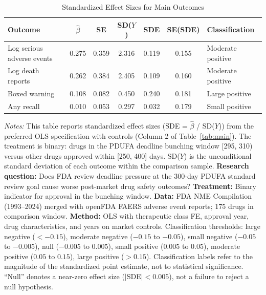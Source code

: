 \begin{table}[H]
\centering
\caption{Standardized Effect Sizes for Main Outcomes}
\label{tab:sde}
\begin{tabular}{lcccccl}
\toprule
Outcome & $\hat{\beta}$ & SE & SD($Y$) & SDE & SE(SDE) & Classification \\
\midrule
Log serious adverse events & 0.275 & 0.359 & 2.316 & 0.119 & 0.155 & Moderate positive \\
Log death reports & 0.262 & 0.384 & 2.405 & 0.109 & 0.160 & Moderate positive \\
Boxed warning & 0.108 & 0.082 & 0.450 & 0.240 & 0.181 & Large positive \\
Any recall & 0.010 & 0.053 & 0.297 & 0.032 & 0.179 & Small positive \\
\bottomrule
\end{tabular}
\par\vspace{0.3em}
{\footnotesize \emph{Notes:} This table reports standardized effect sizes (SDE = $\hat{\beta}$ / SD($Y$)) from the preferred OLS specification with controls (Column 2 of Table~\ref{tab:main}). The treatment is binary: drugs in the PDUFA deadline bunching window [295, 310) versus other drugs approved within [250, 400] days. SD($Y$) is the unconditional standard deviation of each outcome within the comparison sample. \textbf{Research question:} Does FDA review deadline pressure at the 300-day PDUFA standard review goal cause worse post-market drug safety outcomes? \textbf{Treatment:} Binary indicator for approval in the bunching window. \textbf{Data:} FDA NME Compilation (1993--2024) merged with openFDA FAERS adverse event reports; 175 drugs in comparison window. \textbf{Method:} OLS with therapeutic class FE, approval year, drug characteristics, and years on market controls. Classification thresholds: large negative ($<-0.15$), moderate negative ($-0.15$ to $-0.05$), small negative ($-0.05$ to $-0.005$), null ($-0.005$ to $0.005$), small positive ($0.005$ to $0.05$), moderate positive ($0.05$ to $0.15$), large positive ($>0.15$). Classification labels refer to the magnitude of the standardized point estimate, not to statistical significance. ``Null'' denotes a near-zero effect size ($|$SDE$| < 0.005$), not a failure to reject a null hypothesis.}
\end{table}
